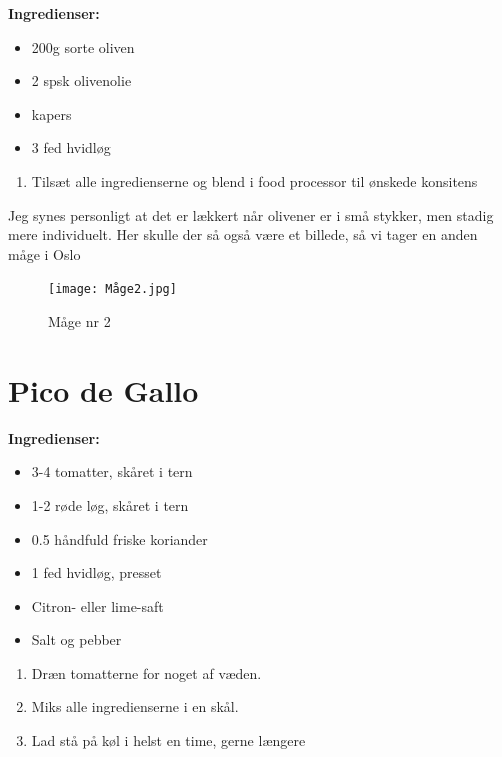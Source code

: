 \documentclass{book}
\begin{document}
\begin{minipage}[t]{0.5\textwidth}
\textbf{Ingredienser:}
\begin{itemize}
    \item 200g sorte oliven
    \item 2 spsk olivenolie
    \item kapers
    \item 3 fed hvidløg
\end{itemize}
\end{minipage}
\begin{minipage}[t]{0.5\textwidth}
\begin{enumerate}
    \item Tilsæt alle ingredienserne og blend i food processor til ønskede konsitens
\end{enumerate}
\end{minipage}
Jeg synes personligt at det er lækkert når olivener er i små stykker, men stadig mere individuelt.
\newpage Her skulle der så også være et billede, så vi tager en anden måge i Oslo
\begin{figure}
    \centering
    \texttt{[image: Måge2.jpg]}
    \caption{Måge nr 2}
    
\end{figure}
\newpage \section{Pico de Gallo}
\begin{minipage}[t]{0.5\textwidth}
\textbf{Ingredienser:}
\begin{itemize}
    \item 3-4 tomatter, skåret i tern
    \item 1-2 røde løg, skåret i tern
    \item 0.5 håndfuld friske koriander
    \item 1 fed hvidløg, presset
    \item Citron- eller lime-saft
    \item Salt og pebber
\end{itemize}
\end{minipage}
\begin{minipage}[t]{0.5\textwidth}
\begin{enumerate}
    \item Dræn tomatterne for noget af væden.
    \item Miks alle ingredienserne i en skål.
    \item Lad stå på køl i helst en time, gerne længere
\end{enumerate}
\end{minipage}
\end{document}
